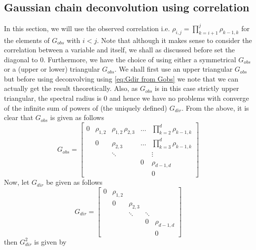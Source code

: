 \documentclass[../Thesis.tex]{subfiles}
\begin{document}
\subsection{Gaussian chain deconvolution using correlation}
In this section, we will use the observed correlation i.e. $\rho_{i,j} = \prod_{k=i+1}^{j} \rho_{k-1,k}$ for the elements of $G_{obs}$ with $i< j$. Note that although it makes sense to consider the correlation between a variable and itself, we shall as discussed before set the diagonal to $0$. Furthermore, we have the choice of using either a symmetrical $G_{obs}$ or a (upper or lower) triangular $G_{obs}$. We shall first use an upper triangular $G_{obs}$ but before using deconvolving using \autoref{eq:Gdir from Gobs} we note that we can actually get the result theoretically. Also, as $G_{obs}$ is in this case strictly upper triangular, the spectral radius is $0$ and hence we have no problems with converge of the infinite sum of powers of (the uniquely defined) $G_{dir}$. From the above, it is clear that $G_{obs}$ is given as follows
\begin{equation}\label{eq:Gaussian chain G_obs triangular form}
    G_{obs} = \begin{bmatrix}
        0 & \rho_{1,2} & \rho_{1,2}\,\rho_{2,3} & \dots & \prod_{k=2}^{d} \rho_{k-1,k} \\
          & 0          & \rho_{2,3}             & \dots & \prod_{k=3}^{d} \rho_{k-1,k} \\
          &            & \ddots                 &       & \vdots                       \\
          &            &                        & 0     & \rho_{d-1,d}                 \\
          &            &                        &       & 0
    \end{bmatrix}
\end{equation}
Now, let $G_{dir}$ be given as follows
$$G_{dir} = \begin{bmatrix}
        0 & \rho_{1,2} &            &        &              \\
          & 0          & \rho_{2,3} &        &              \\
          &            & \ddots     & \ddots &              \\
          &            &            & 0      & \rho_{d-1,d} \\
          &            &            &        & 0
    \end{bmatrix}$$
then $G_{dir}^2$ is given by
\end{document}
